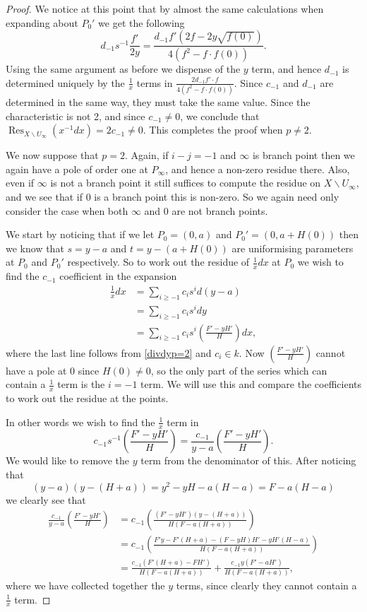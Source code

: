\documentclass[draft, 11pt]{article} %
\theoremstyle{plain}
\theoremstyle{remark}
\DeclareMathOperator{\res}{Res}
\begin{document}
\begin{proof}
We notice at this point that by almost the same calculations when expanding about $P_0'$ we get the following
\[
d_{-1}s^{-1}\frac{f'}{2y} = \frac{d_{-1}f'\left(2f-2y\sqrt{f(0)}\right) }{4(f^2 - f\cdot f(0))}.
\]
Using the same argument as before we dispense of the $y$ term, and hence $d_{-1}$ is determined uniquely by the $\frac{1}{x}$ terms in $\frac{2d_{-1}f' \cdot f}{4(f^2-f\cdot f(0))}$.
Since $c_{-1}$ and $d_{-1}$ are determined in the same way, they must take the same value. 
Since the characteristic is not 2, and since $c_{-1} \neq 0$, we conclude that $\res_{X\backslash U_\infty}(x^{-1}dx) = 2c_{-1} \neq 0$.
This completes the proof when $p \neq 2$.

We now suppose that $p=2$.
Again, if $i-j=-1$ and $\infty$ is branch point then we again have a pole of order one at $P_\infty$, and hence a non-zero residue there.
Also, even if $\infty$ is not a branch point it still suffices to compute the residue on $X\backslash U_\infty$, and we see that if $0$ is a branch point this is non-zero.
So we again need only consider the case when both $\infty$ and $0$ are not branch points.

We start by noticing that if we let $P_0 = (0,a)$ and $P_0' = (0,a+H(0))$ then we know that $s=y-a$ and $t=y-(a+H(0))$ are uniformising parameters at $P_0$ and $P_0'$ respectively.
So to work out the residue of $\frac{1}{x}dx$ at $P_0$ we wish to find the $c_{-1}$ coefficient in the expansion
\begin{align*}
\frac{1}{x}dx & = \sum_{i \geq -1} c_i s^i d(y-a) \\
& = \sum_{i\geq -1} c_i s^i dy \\
& = \sum_{i \geq -1} c_i s^i \left(\frac{F' - yH'}{H} \right) dx,
\end{align*}
where the last line follows from \eqref{divdyp=2} and $c_i \in k$.
Now $\left(\frac{F' -yH'}{H}\right)$ cannot have a pole at $0$ since $H(0) \neq 0$, so the only part of the series which can contain a $\frac{1}{x}$ term is the $i=-1$ term.
We will use this and compare the coefficients to work out the residue at the points. 

In other words we wish to find the $\frac{1}{x}$ term in 
\[
c_{-1}s^{-1}\left(\frac{F' - yH'}{H} \right) = \frac{c_{-1}}{y-a} \left( \frac{F' - yH'}{H} \right).
\]
We would like to remove the $y$ term from the denominator of this.
After noticing that 
\[
(y-a)(y-(H+a)) = y^2 - yH - a(H-a) = F- a(H-a)
\]
we clearly see that 
\begin{align*}
\frac{c_{-1}}{y-a} \left( \frac{F' - yH'}{H} \right) & = c_{-1} \left( \frac{(F'-yH')(y-(H+a))}{H(F-a(H+a))} \right) \\
& = c_{-1} \left( \frac{F'y - F'(H+a) - (F -yH)H' - yH'(H-a)}{H(F-a(H+a))} \right) \\
& = \frac{c_{-1}(F'(H+a) - FH')}{H(F-a(H+a))} + \frac{c_{-1}y(F' - aH')}{H(F-a(H+a))},
\end{align*}
where we have collected together the $y$ terms, since clearly they cannot contain a $\frac{1}{x}$ term.


\end{proof}
\end{document}
